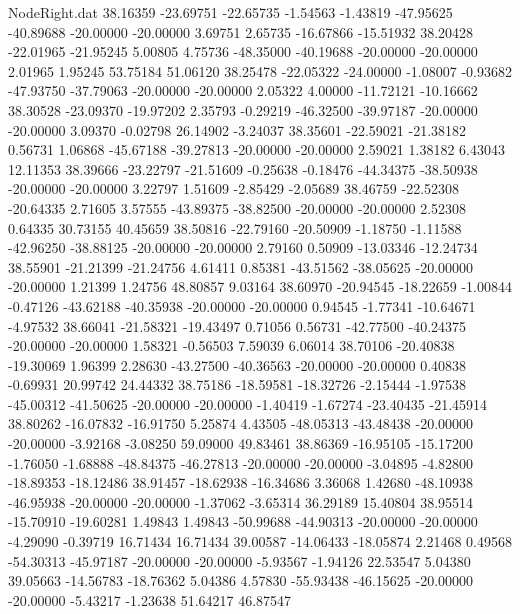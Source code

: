 \begin{filecontents}{NodeRight.dat}
  38.16359  -23.69751  -22.65735    -1.54563   -1.43819  -47.95625  -40.89688  -20.00000  -20.00000    3.69751    2.65735  -16.67866  -15.51932
  38.20428  -22.01965  -21.95245     5.00805    4.75736  -48.35000  -40.19688  -20.00000  -20.00000    2.01965    1.95245   53.75184   51.06120
  38.25478  -22.05322  -24.00000    -1.08007   -0.93682  -47.93750  -37.79063  -20.00000  -20.00000    2.05322    4.00000  -11.72121  -10.16662
  38.30528  -23.09370  -19.97202     2.35793   -0.29219  -46.32500  -39.97187  -20.00000  -20.00000    3.09370   -0.02798   26.14902   -3.24037
  38.35601  -22.59021  -21.38182     0.56731    1.06868  -45.67188  -39.27813  -20.00000  -20.00000    2.59021    1.38182    6.43043   12.11353
  38.39666  -23.22797  -21.51609    -0.25638   -0.18476  -44.34375  -38.50938  -20.00000  -20.00000    3.22797    1.51609   -2.85429   -2.05689
  38.46759  -22.52308  -20.64335     2.71605    3.57555  -43.89375  -38.82500  -20.00000  -20.00000    2.52308    0.64335   30.73155   40.45659
  38.50816  -22.79160  -20.50909    -1.18750   -1.11588  -42.96250  -38.88125  -20.00000  -20.00000    2.79160    0.50909  -13.03346  -12.24734
  38.55901  -21.21399  -21.24756     4.61411    0.85381  -43.51562  -38.05625  -20.00000  -20.00000    1.21399    1.24756   48.80857    9.03164
  38.60970  -20.94545  -18.22659    -1.00844   -0.47126  -43.62188  -40.35938  -20.00000  -20.00000    0.94545   -1.77341  -10.64671   -4.97532
  38.66041  -21.58321  -19.43497     0.71056    0.56731  -42.77500  -40.24375  -20.00000  -20.00000    1.58321   -0.56503    7.59039    6.06014
  38.70106  -20.40838  -19.30069     1.96399    2.28630  -43.27500  -40.36563  -20.00000  -20.00000    0.40838   -0.69931   20.99742   24.44332
  38.75186  -18.59581  -18.32726    -2.15444   -1.97538  -45.00312  -41.50625  -20.00000  -20.00000   -1.40419   -1.67274  -23.40435  -21.45914
  38.80262  -16.07832  -16.91750     5.25874    4.43505  -48.05313  -43.48438  -20.00000  -20.00000   -3.92168   -3.08250   59.09000   49.83461
  38.86369  -16.95105  -15.17200    -1.76050   -1.68888  -48.84375  -46.27813  -20.00000  -20.00000   -3.04895   -4.82800  -18.89353  -18.12486
  38.91457  -18.62938  -16.34686     3.36068    1.42680  -48.10938  -46.95938  -20.00000  -20.00000   -1.37062   -3.65314   36.29189   15.40804
  38.95514  -15.70910  -19.60281     1.49843    1.49843  -50.99688  -44.90313  -20.00000  -20.00000   -4.29090   -0.39719   16.71434   16.71434
  39.00587  -14.06433  -18.05874     2.21468    0.49568  -54.30313  -45.97187  -20.00000  -20.00000   -5.93567   -1.94126   22.53547    5.04380
  39.05663  -14.56783  -18.76362     5.04386    4.57830  -55.93438  -46.15625  -20.00000  -20.00000   -5.43217   -1.23638   51.64217   46.87547

\end{filecontents}
